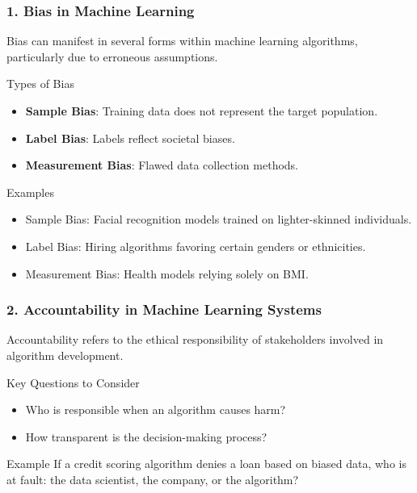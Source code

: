 \documentclass[aspectratio=169]{beamer}
\begin{document}
\begin{frame}[fragile]
    \frametitle{1. Bias in Machine Learning}
    Bias can manifest in several forms within machine learning algorithms, particularly due to erroneous assumptions. 

    \begin{block}{Types of Bias}
        \begin{itemize}
            \item \textbf{Sample Bias}: Training data does not represent the target population.
            \item \textbf{Label Bias}: Labels reflect societal biases.
            \item \textbf{Measurement Bias}: Flawed data collection methods.
        \end{itemize}
    \end{block}

    \begin{exampleblock}{Examples}
        \begin{itemize}
            \item Sample Bias: Facial recognition models trained on lighter-skinned individuals.
            \item Label Bias: Hiring algorithms favoring certain genders or ethnicities.
            \item Measurement Bias: Health models relying solely on BMI.
        \end{itemize}
    \end{exampleblock}
\end{frame}

\begin{frame}[fragile]
    \frametitle{2. Accountability in Machine Learning Systems}
    Accountability refers to the ethical responsibility of stakeholders involved in algorithm development.

    \begin{block}{Key Questions to Consider}
        \begin{itemize}
            \item Who is responsible when an algorithm causes harm?
            \item How transparent is the decision-making process?
        \end{itemize}
    \end{block}

    \begin{exampleblock}{Example}
        If a credit scoring algorithm denies a loan based on biased data, who is at fault: the data scientist, the company, or the algorithm?
    \end{exampleblock}
\end{frame}
\end{document}
